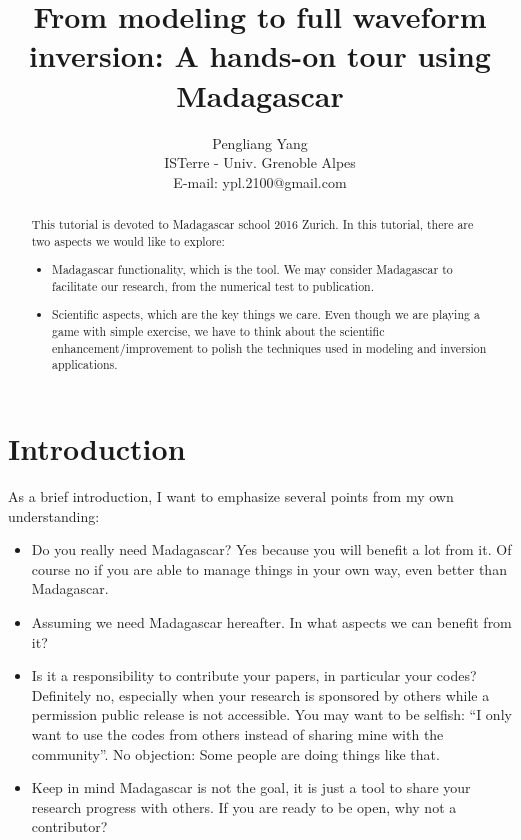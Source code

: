 \title{From modeling to full waveform inversion: A hands-on tour using Madagascar}
\author{Pengliang Yang\\
ISTerre - Univ. Grenoble Alpes\\
E-mail: ypl.2100@gmail.com}


\maketitle

\begin{abstract}
This tutorial is devoted to Madagascar school 2016 Zurich. In this tutorial, there are two aspects we would like to explore: 
\begin{itemize}
 \item Madagascar functionality, which is the tool. We may consider Madagascar to facilitate our research, from the numerical test to publication.
 \item Scientific aspects, which are the key things we care. Even though we are playing a game with simple exercise, we have to think about the scientific enhancement/improvement to polish the techniques used in modeling and inversion applications.
\end{itemize}
\end{abstract}

\section{Introduction}
As a brief introduction, I want to emphasize several points from my own understanding:
\begin{itemize}
 \item Do you really need Madagascar? Yes because you will benefit a lot from it. Of course no if you are able to manage things in your own way, even better than Madagascar.
 \item Assuming we need Madagascar hereafter. In what aspects we can benefit from it? 
 \item Is it a responsibility to contribute your papers, in particular your codes? Definitely no, especially when your research is sponsored by others while a permission public release is not accessible. You may want to be selfish: ``I only want to use the codes from others instead of sharing mine with the community''. No objection: Some people are doing things like that.
 \item Keep in mind Madagascar is not the goal, it is just a tool to share your research progress with others. If you are ready to be open, why not a contributor?
\end{itemize}



